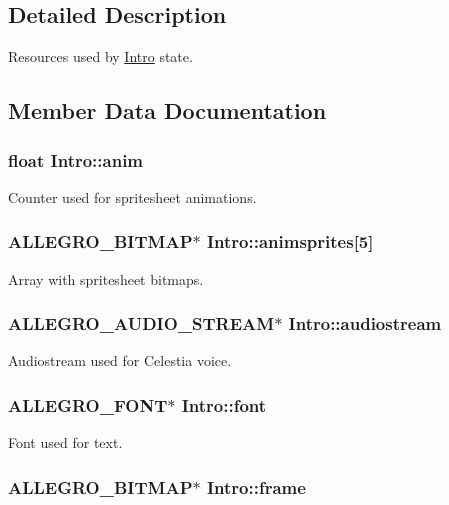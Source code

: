 \subsection{Detailed Description}
Resources used by \hyperlink{structIntro}{Intro} state. 

\subsection{Member Data Documentation}
\hypertarget{structIntro_a7bac02ef374847f0efbe638892cb401f}{
\subsubsection[{anim}]{\setlength{\rightskip}{0pt plus 5cm}float Intro\-::anim}}\label{structIntro_a7bac02ef374847f0efbe638892cb401f}
Counter used for spritesheet animations. \hypertarget{structIntro_ae89a2ad7dfed9e06a558a5f92bba55bc}{
\subsubsection[{animsprites}]{\setlength{\rightskip}{0pt plus 5cm}A\-L\-L\-E\-G\-R\-O\-\_\-\-B\-I\-T\-M\-A\-P$\ast$ Intro\-::animsprites\mbox{[}5\mbox{]}}}\label{structIntro_ae89a2ad7dfed9e06a558a5f92bba55bc}
Array with spritesheet bitmaps. \hypertarget{structIntro_a879aa48597b2f7b6fbeb9f9911234350}{
\subsubsection[{audiostream}]{\setlength{\rightskip}{0pt plus 5cm}A\-L\-L\-E\-G\-R\-O\-\_\-\-A\-U\-D\-I\-O\-\_\-\-S\-T\-R\-E\-A\-M$\ast$ Intro\-::audiostream}}\label{structIntro_a879aa48597b2f7b6fbeb9f9911234350}
Audiostream used for Celestia voice. \hypertarget{structIntro_a896d4fdd74cf47535173eeaa6e81f734}{
\subsubsection[{font}]{\setlength{\rightskip}{0pt plus 5cm}A\-L\-L\-E\-G\-R\-O\-\_\-\-F\-O\-N\-T$\ast$ Intro\-::font}}\label{structIntro_a896d4fdd74cf47535173eeaa6e81f734}
Font used for text. \hypertarget{structIntro_a122ded263b7d3b22ee9a11555d84df52}{
\subsubsection[{frame}]{\setlength{\rightskip}{0pt plus 5cm}A\-L\-L\-E\-G\-R\-O\-\_\-\-B\-I\-T\-M\-A\-P$\ast$ Intro\-::frame}}\label{structIntro_a122ded263b7d3b22ee9a11555d84df52}
